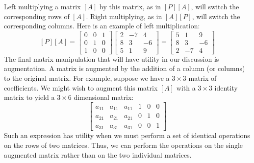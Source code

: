 \documentclass[../main.tex]{subfiles}
\begin{document}
Left multiplying a matrix $[A]$ by this matrix, as in $[P][A]$, will switch the corresponding rows of $[A]$. Right multiplying, as in $[A][P]$, will switch the corresponding columns. Here is an example of left multiplication:
$$
[P][A]=\left[\begin{array}{lll}
0 & 0 & 1 \\
0 & 1 & 0 \\
1 & 0 & 0
\end{array}\right]\left[\begin{array}{ccc}
2 & -7 & 4 \\
8 & 3 & -6 \\
5 & 1 & 9
\end{array}\right]=\left[\begin{array}{ccc}
5 & 1 & 9 \\
8 & 3 & -6 \\
2 & -7 & 4
\end{array}\right]
$$
The final matrix manipulation that will have utility in our discussion is augmentation. A matrix is augmented by the addition of a column (or columns) to the original matrix. For example, suppose we have a $3 \times 3$ matrix of coefficients. We might wish to augment this matrix $[A]$ with a $3 \times 3$ identity matrix to yield a $3 \times 6$ dimensional matrix:
$$
\left[\begin{array}{lll|lll}
a_{11} & a_{11} & a_{11} & 1 & 0 & 0 \\
a_{21} & a_{21} & a_{21} & 0 & 1 & 0 \\
a_{31} & a_{31} & a_{31} & 0 & 0 & 1
\end{array}\right]
$$
Such an expression has utility when we must perform a set of identical operations on the rows of two matrices. Thus, we can perform the operations on the single augmented matrix rather than on the two individual matrices.
\end{document}
